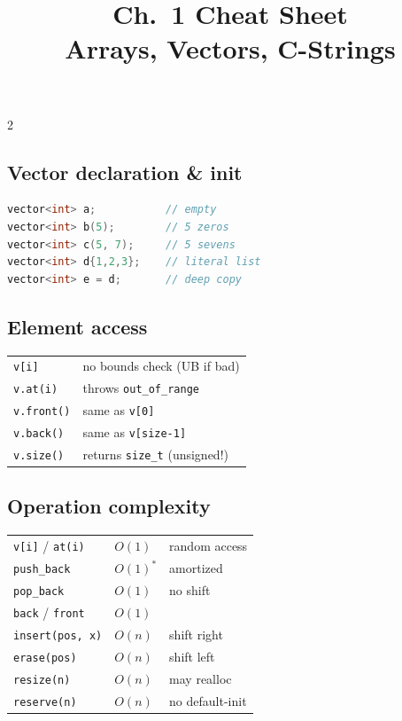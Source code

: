 \documentclass[10pt]{article}
\title{Ch.~1 Cheat Sheet\\\large Arrays, Vectors, C-Strings}
\author{}
\date{}
\begin{document}
\maketitle
\vspace{-2em}

\begin{multicols}{2}

\subsection*{Vector declaration \& init}
\begin{lstlisting}[language=C++]
vector<int> a;           // empty
vector<int> b(5);        // 5 zeros
vector<int> c(5, 7);     // 5 sevens
vector<int> d{1,2,3};    // literal list
vector<int> e = d;       // deep copy
\end{lstlisting}

\subsection*{Element access}
\begin{tabular}{@{}ll@{}}
\texttt{v[i]}        & no bounds check (UB if bad)\\
\texttt{v.at(i)}     & throws \texttt{out\_of\_range}\\
\texttt{v.front()}   & same as \texttt{v[0]}\\
\texttt{v.back()}    & same as \texttt{v[size-1]}\\
\texttt{v.size()}    & returns \texttt{size\_t} (unsigned!)
\end{tabular}

\subsection*{Operation complexity}
\begin{tabular}{@{}lll@{}}
\texttt{v[i]} / \texttt{at(i)}   & $O(1)$    & random access\\
\texttt{push\_back}              & $O(1)^*$  & amortized\\
\texttt{pop\_back}               & $O(1)$    & no shift\\
\texttt{back} / \texttt{front}   & $O(1)$    & \\
\texttt{insert(pos, x)}          & $O(n)$    & shift right\\
\texttt{erase(pos)}              & $O(n)$    & shift left\\
\texttt{resize(n)}               & $O(n)$    & may realloc\\
\texttt{reserve(n)}              & $O(n)$    & no default-init
\end{tabular}


\end{multicols}
\end{document}
